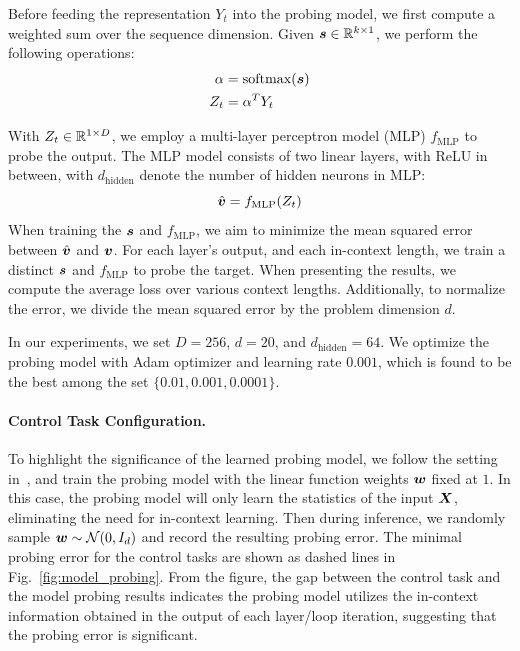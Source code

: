 \documentclass{article} %
\theoremstyle{plain}
\theoremstyle{definition}
\theoremstyle{remark}
\begin{document}
Before feeding the representation $Y_t$ into the probing model, we first compute a weighted sum over the sequence dimension. Given ${\bm{s}} \in \mathbb{R}^{k\times 1}$, we perform the following operations:
\begin{align}
\alpha &= \text{softmax}({\bm{s}}) \\
Z_t &= \alpha^T Y_t     
\end{align}

With $Z_t \in \mathbb{R}^{1 \times D}$, we employ a multi-layer perceptron model (MLP) $f_{\text{MLP}}$ to probe the output. The MLP model consists of two linear layers, with ReLU in between, with $d_{\text{hidden}}$ denote the number of hidden neurons in MLP:
$$
\hat{{\bm{v}}} = f_{\text{MLP}}(Z_t)
$$
When training the ${\bm{s}}$ and $f_{\text{MLP}}$, we aim to minimize the mean squared error between $\hat{{\bm{v}}}$ and ${\bm{v}}$. For each layer's output, and each in-context length, we train a distinct ${\bm{s}}$ and $f_{\text{MLP}}$ to probe the target. When presenting the results, we compute the average loss over various context lengths. Additionally, to normalize the error, we divide the mean squared error by the problem dimension $d$.

In our experiments, we set $D=256$, $d=20$, and $d_{\text{hidden}}=64$. We optimize the probing model with Adam optimizer and learning rate $0.001$, which is found to be the best among the set $\{0.01, 0.001, 0.0001\}$.

\paragraph{Control Task Configuration.} To highlight the significance of the learned probing model, we follow the setting in~\citet{Akyrek2022WhatLA}, and train the probing model with the linear function weights ${\bm{w}}$ fixed at $1$. In this case, the probing model will only learn the statistics of the input ${\bm{X}}$, eliminating the need for in-context learning. Then during inference, we randomly sample ${\bm{w}} \sim \mathcal{N}(0, I_d)$ and record the resulting probing error. The minimal probing error for the control tasks are shown as dashed lines in Fig.~\ref{fig:model_probing}. 
From the figure, the gap between the control task and the model probing results indicates the probing model utilizes the in-context information obtained in the output of each layer/loop iteration, suggesting that the probing error is significant.
\end{document}
